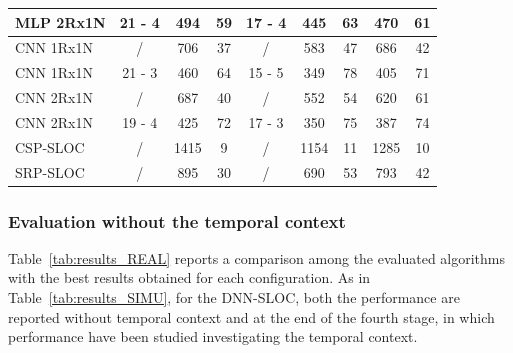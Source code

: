 \documentclass[review]{elsarticle}
\newcommand{\tableref}[1]{Table~\ref{#1}}
\begin{document}
\begin{table}[!h]
{\begin{tabular}{l|ccc|ccc|cc}
			MLP 2Rx1N & 21 - 4                      & 494                      & 59                            & 17 - 4                      & 445                      & 63                            & 470                      & 61                            \\ \hline
			CNN 1Rx1N & /                          & 706                      & 37                            & /                          & 583                      & 47                            & 686                      & 42                            \\
			CNN 1Rx1N & 21 - 3                      & 460                      & 64                            & 15 - 5                      & 349                      & 78                            & 405                     & 71                            \\ \hline
			CNN 2Rx1N & /                          & 687                      & 40                            & /                          & 552                      & 54                            & 620                     & 61                            \\
			CNN 2Rx1N & 19 - 4                      & 425                      & 72                            & 17 - 3                      & 350                      & 75                            & 387                      & 74                            \\ \hline
			CSP-SLOC  & /                          & 1415                     & 9                             & /                          & 1154                     & 11                            & 1285                     & 10                            \\ \hline
			SRP-SLOC  & /                          & 895                      & 30                            & /                          & 690                      & 53                            & 793                      & 42                                                  
			
		\end{tabular}
	}
\end{table}


\subsubsection{Evaluation without the temporal context}
\tableref{tab:results_REAL} reports a comparison among the evaluated algorithms with the best results obtained for each configuration. As in \tableref{tab:results_SIMU}, for the DNN-SLOC, both the performance are reported without temporal context and at the end of the fourth stage, in which performance have been studied investigating the temporal context.
\end{document}
